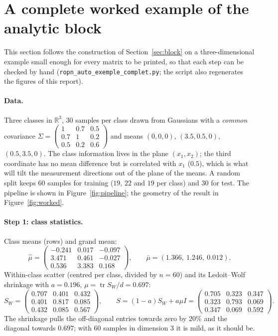 \documentclass[11pt,a4paper]{article}
\theoremstyle{plain}
\theoremstyle{definition}
\theoremstyle{remark}
\newcommand{\R}{\mathbb R}
\newcommand{\tr}{\operatorname{tr}}
\begin{document}
\section{A complete worked example of the analytic block}
\label{sec:worked}
This section follows the construction of Section~\ref{sec:block} on a
three-dimensional example small enough for every matrix to be printed, so
that each step can be checked by hand (\texttt{ropn\_auto\_exemple\_complet.py};
the script also regenerates the figures of this report).

\paragraph{Data.} Three classes in $\R^3$, $30$ samples per class drawn
from Gaussians with a \emph{common} covariance
$\Sigma=\begin{pmatrix}1&0.7&0.5\\0.7&1&0.2\\0.5&0.2&0.6\end{pmatrix}$ and
means $(0,0,0)$, $(3.5,0.5,0)$, $(0.5,3.5,0)$. The class information lives
in the plane $(x_1,x_2)$; the third coordinate has no mean difference but is
correlated with $x_1$ ($0.5$), which is what will tilt the measurement
directions out of the plane of the means. A random split keeps $60$ samples
for training ($19$, $22$ and $19$ per class) and $30$ for test. The pipeline is shown in
Figure~\ref{fig:pipeline}; the geometry of the result in
Figure~\ref{fig:worked}.

\paragraph{Step 1: class statistics.} Class means (rows) and grand mean:
\[
\hat\mu=\begin{pmatrix}-0.241&0.017&-0.097\\3.471&0.461&-0.027\\0.536&3.383&0.168\end{pmatrix},\qquad
\bar\mu=(1.366,\ 1.246,\ 0.012).
\]
Within-class scatter (centred per class, divided by $n=60$) and its
Ledoit--Wolf shrinkage with $a=0.196$, $\mu=\tr S_W/d=0.697$:
\[
S_W=\begin{pmatrix}0.707&0.401&0.432\\0.401&0.817&0.085\\0.432&0.085&0.567\end{pmatrix},\qquad
S=(1-a)S_W+a\mu I=\begin{pmatrix}0.705&0.323&0.347\\0.323&0.793&0.069\\0.347&0.069&0.592\end{pmatrix}.
\]
The shrinkage pulls the off-diagonal entries towards zero by $20\%$ and the
diagonal towards $0.697$; with $60$ samples in dimension $3$ it is mild, as
it should be.
\end{document}
